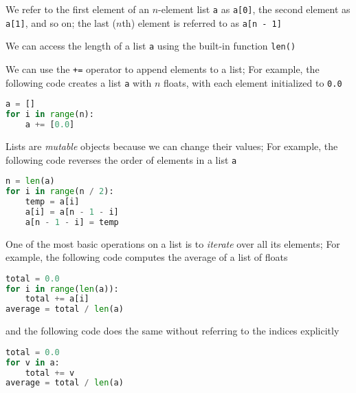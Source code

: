 \documentclass[8pt,a4paper,compress]{beamer}
\begin{document}
\begin{frame}[fragile]
We refer to the first element of an $n$-element list \lstinline{a} as \lstinline{a[0]}, the second element as \lstinline{a[1]}, and so on; the last ($n$th) element is referred to as \lstinline{a[n - 1]}

\bigskip

We can access the length of a list \lstinline{a} using the built-in function \lstinline{len()}

\bigskip

We can use the \lstinline{+=} operator to append elements to a list; For example, the following code creates a list \lstinline{a} with $n$ floats, with each element initialized to \lstinline{0.0}

\begin{lstlisting}[language=Python]
a = []
for i in range(n):
    a += [0.0]
\end{lstlisting} 
\end{frame}

\begin{frame}[fragile]
Lists are \emph{mutable} objects because we can change their values; For example, the following code reverses the order of elements in a list \lstinline{a}

\begin{lstlisting}[language=Python]
n = len(a)
for i in range(n / 2):
    temp = a[i]
    a[i] = a[n - 1 - i]
    a[n - 1 - i] = temp
\end{lstlisting}

\bigskip

One of the most basic operations on a list is to \emph{iterate} over all its elements; For example, the following code computes the average of a list of floats

\begin{lstlisting}[language=Python]
total = 0.0
for i in range(len(a)):
    total += a[i]
average = total / len(a)
\end{lstlisting}

and the following code does the same without referring to the indices explicitly

\begin{lstlisting}[language=Python]
total = 0.0
for v in a:
    total += v
average = total / len(a)
\end{lstlisting}
\end{frame}
\end{document}
